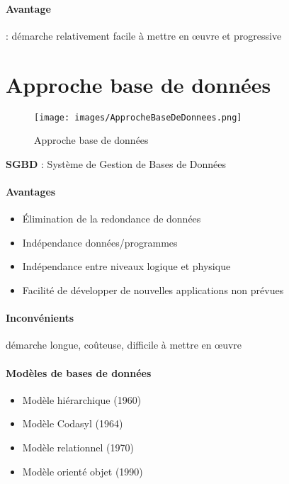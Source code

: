 \documentclass[10pt]{article}
\begin{document}
        \paragraph{Avantage} : démarche relativement facile à mettre en œuvre et progressive

    \section{Approche base de données}

        \begin{figure}[H]
            \begin{center}
                \texttt{[image: images/ApprocheBaseDeDonnees.png]}
            \end{center}
            \caption{Approche base de données}
        \end{figure}

        \textbf{SGBD} : Système de Gestion de Bases de Données

        \paragraph{Avantages}
            \begin{itemize}
                \item Élimination de la redondance de données
                \item Indépendance données/programmes
                \item Indépendance entre niveaux logique et physique
                \item Facilité de développer de nouvelles applications non prévues
            \end{itemize}

        \paragraph{Inconvénients} démarche longue, coûteuse, difficile à mettre en œuvre

        \paragraph{Modèles de bases de données}
            \begin{itemize}
                \item Modèle hiérarchique (1960)
                \item Modèle Codasyl (1964)
                \item Modèle relationnel (1970)
                \item Modèle orienté objet (1990)
            \end{itemize}
\end{document}
